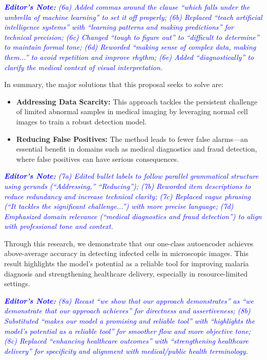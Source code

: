 \documentclass[journal,12pt,onecolumn,draftcls]{IEEEtran}
\newcommand{\editornote}[1]{\par\textit{\textcolor{blue}{\textbf{Editor's Note:} #1}}\par}
\begin{document}
\editornote{(6a) Added commas around the clause “which falls under the umbrella of machine learning” to set it off properly; 
(6b) Replaced “teach artificial intelligence systems” with “learning patterns and making predictions” for technical precision; 
(6c) Changed “tough to figure out” to “difficult to determine” to maintain formal tone; 
(6d) Reworded “making sense of complex data, making them...” to avoid repetition and improve rhythm; 
(6e) Added “diagnostically” to clarify the medical context of visual interpretation.}

In summary, the major solutions that this proposal seeks to solve are:
\begin{itemize}
  \item \textbf{Addressing Data Scarcity:} This approach tackles the persistent challenge of limited abnormal samples in medical imaging by leveraging normal cell images to train a robust detection model.
  \item \textbf{Reducing False Positives:} The method leads to fewer false alarms—an essential benefit in domains such as medical diagnostics and fraud detection, where false positives can have serious consequences.
\end{itemize}

\editornote{(7a) Edited bullet labels to follow parallel grammatical structure using gerunds (“Addressing,” “Reducing”); 
(7b) Reworded item descriptions to reduce redundancy and increase technical clarity; 
(7c) Replaced vague phrasing (“It tackles the significant challenge...”) with more precise language; 
(7d) Emphasized domain relevance (“medical diagnostics and fraud detection”) to align with professional tone and context.}

Through this research, we demonstrate that our one-class autoencoder achieves above-average accuracy in detecting infected cells in microscopic images. This result highlights the model’s potential as a reliable tool for improving malaria diagnosis and strengthening healthcare delivery, especially in resource-limited settings.

\editornote{(8a) Recast “we show that our approach demonstrates” as “we demonstrate that our approach achieves” for directness and assertiveness; 
(8b) Substituted “makes our model a promising and reliable tool” with “highlights the model’s potential as a reliable tool” for smoother flow and more objective tone; 
(8c) Replaced “enhancing healthcare outcomes” with “strengthening healthcare delivery” for specificity and alignment with medical/public health terminology.}
\end{document}

